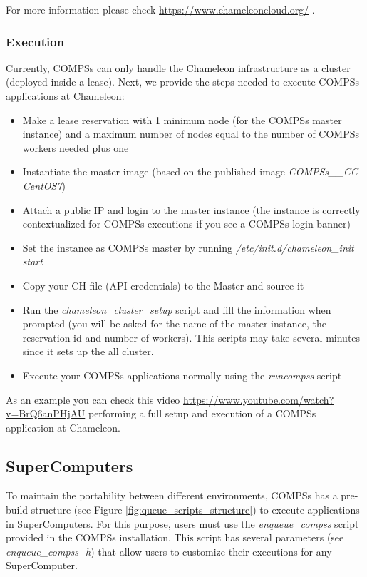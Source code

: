 For more information please check \url{https://www.chameleoncloud.org/} .

\subsubsection{Execution}
Currently, COMPSs can only handle the Chameleon infrastructure as a cluster (deployed inside a lease). Next, we provide the steps
needed to execute COMPSs applications at Chameleon:

\begin{itemize}
 \item Make a lease reservation with 1 minimum node (for the COMPSs master instance) and a maximum number of nodes equal to the
 number of COMPSs workers needed plus one
 \item Instantiate the master image (based on the published image \textit{COMPSs\_\compssversion\_CC-CentOS7})
 \item Attach a public IP and login to the master instance (the instance is correctly contextualized for COMPSs executions if you
 see a COMPSs login banner)
 \item Set the instance as COMPSs master by running \textit{/etc/init.d/chameleon\_init start}
 \item Copy your CH file (API credentials) to the Master and source it
 \item Run the \textit{chameleon\_cluster\_setup} script and fill the information when prompted (you will be asked for the name of the
 master instance, the reservation id and number of workers). This scripts may take several minutes since it sets up the all cluster.
 \item Execute your COMPSs applications normally using the \textit{runcompss} script
\end{itemize}

As an example you can check this video \url{https://www.youtube.com/watch?v=BrQ6anPHjAU} performing a full setup and 
execution of a COMPSs application at Chameleon.


\subsection{SuperComputers}

To maintain the portability between different environments, COMPSs has a pre-build structure (see Figure 
\ref{fig:queue_scripts_structure}) to execute applications in SuperComputers. For this purpose, users must use 
the \textit{enqueue\_compss} script provided in the COMPSs installation. This script has several parameters (see 
\textit{enqueue\_compss -h}) that allow users to customize their executions for any SuperComputer.

